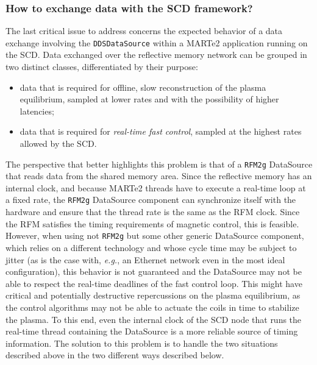 \subsubsection{How to exchange data with the SCD framework?}
\label{sec:ddsdatasource_marte2}
The last critical issue to address concerns the expected behavior of a data exchange involving the \texttt{DDSDataSource} within a MARTe2 application running on the SCD. Data exchanged over the reflective memory network can be grouped in two distinct classes, differentiated by their purpose:
\begin{itemize}
  \item data that is required for offline, slow reconstruction of the plasma equilibrium, sampled at lower rates and with the possibility of higher latencies;
  \item data that is required for \emph{real-time fast control}, sampled at the highest rates allowed by the SCD.
\end{itemize}
The perspective that better highlights this problem is that of a \texttt{RFM2g} DataSource that reads data from the shared memory area. Since the reflective memory has an internal clock, and because MARTe2 threads have to execute a real-time loop at a fixed rate, the \texttt{RFM2g} DataSource component can synchronize itself with the hardware and ensure that the thread rate is the same as the RFM clock. Since the RFM satisfies the timing requirements of magnetic control, this is feasible. However, when using not \texttt{RFM2g} but some other generic DataSource component, which relies on a different technology and whose cycle time may be subject to jitter (as is the case with, \emph{e.g.}, an Ethernet network even in the most ideal configuration), this behavior is not guaranteed and the DataSource may not be able to respect the real-time deadlines of the fast control loop. This might have critical and potentially destructive repercussions on the plasma equilibrium, as the control algorithms may not be able to actuate the coils in time to stabilize the plasma. To this end, even the internal clock of the SCD node that runs the real-time thread containing the DataSource is a more reliable source of timing information. The solution to this problem is to handle the two situations described above in the two different ways described below.
